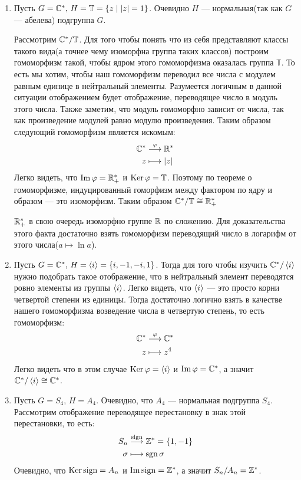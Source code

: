 \documentclass[../main.tex]{subfiles}
\begin{document}
\begin{examples}
  \begin{enumerate}
    \item Пусть $G = \mathbb{C}^{*}, \, H = \mathbb{T} = \{z \; | \; |z| = 1\}$. Очевидно $H$ --- нормальная(так как $G$ --- абелева) подгруппа $G$.

    Рассмотрим $\mathbb{C}^{*} / \mathbb{T}$. Для того чтобы понять что из себя представляют классы такого вида(а точнее чему изоморфна группа таких классов) построим гомоморфизм такой, чтобы ядром этого гомоморфизма оказалась группа $\mathbb{T}$. То есть мы хотим, чтобы наш гомоморфизм переводил все числа с модулем равным единице в нейтральный элементы. Разумеется логичным в данной ситуации отображением будет отображение, переводящее число в модуль этого числа. Также заметим, что модуль гомоморфно зависит от числа, так как произведение модулей равно модулю произведения. Таким образом следующий гомоморфизм является искомым:
    \begin{align*}
      \mathbb{C}^{*} &\overset{\varphi}{\longrightarrow} \mathbb{R}^{*} \\
      z &\longmapsto |z|
    \end{align*}
  Легко видеть, что $\operatorname{Im} \varphi = \mathbb{R}_{+}^{*}$ и $\operatorname{Ker} \varphi = \mathbb{T}$. Поэтому по теореме о гомоморфизме, индуцированный гоморфизм между фактором по ядру и образом --- это изоморфизм. Таким образом $\mathbb{C}^{*} / \mathbb{T} \cong \mathbb{R}_{+}^{*}$
  \begin{remark}
    $\mathbb{R}_{+}^{*}$ в свою очередь изоморфно группе $\mathbb{R}$ по сложению. Для доказательства этого факта достаточно взять гомоморфизм переводящий число в логарифм от этого числа($a \mapsto \ln a$).
  \end{remark}

  \item Пусть $G = \mathbb{C}^{*}, \, H = \left\langle i \right\rangle = \{i, -1, -i, 1\}$. Тогда для того чтобы изучить $\mathbb{C}^{*} / \left\langle i \right\rangle$ нужно подобрать такое отображение, что в нейтральный элемент переводятся ровно элементы из группы $\left\langle i \right\rangle$. Легко видеть, что $\left\langle i \right\rangle$ --- это просто корни четвертой степени из единицы. Тогда достаточно логично взять в качестве нашего гомоморфизма возведение числа в четвертую степень, то есть гомоморфизм:
    \begin{align*}
      \mathbb{C}^{*} &\overset{\varphi}{\longrightarrow} \mathbb{C}^{*} \\
      z &\longmapsto z^4
    \end{align*}
    Легко видеть что в этом случае $\operatorname{Ker} \varphi = \left\langle i \right\rangle$ и $\operatorname{Im} \varphi = \mathbb{C}^{*}$, а значит $\mathbb{C}^{*}/\left\langle i \right\rangle \cong \mathbb{C}^{*}$.

  \item Пусть $G = S_4, \, H = A_4$. Очевидно, что $A_4$ --- нормальная подгруппа $S_4$. Рассмотрим отображение переводящее перестановку в знак этой перестановки, то есть:
    \begin{align*}
      S_n &\overset{\operatorname{sign}}{\longrightarrow} \mathbb{Z}^{*} = \{1, -1\} \\
      \sigma &\longmapsto \operatorname{sgn} \sigma
    \end{align*}
  Очевидно, что $\operatorname{Ker} \operatorname{sign} = A_n$ и $\operatorname{Im} \operatorname{sign} = \mathbb{Z}^{*}$, а значит $S_n/A_n = \mathbb{Z}^{*}$.
  \end{enumerate}
\end{examples}
\end{document}
